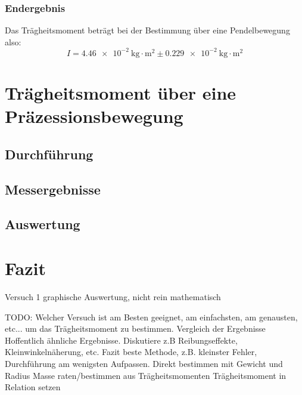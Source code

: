 \documentclass{article}
\begin{document}
			\subsubsection{Endergebnis}
				Das Trägheitsmoment beträgt bei der Bestimmung über eine Pendelbewegung also:
				\begin{equation}
					I = \SI{4,46e-2}{ \kilogram \cdot \metre^2 } \pm \SI{0,229e-2}{ \kilogram \cdot \metre^2 }
				\end{equation}


	\section{Trägheitsmoment über eine Präzessionsbewegung}
		\subsection{Durchführung}

		\subsection{Messergebnisse}
		
		\subsection{Auswertung}

	\section{Fazit}
		Versuch 1 graphische Auswertung, nicht rein mathematisch

		TODO: Welcher Versuch ist am Besten geeignet, am einfachsten, am genausten, etc... um das Trägheitsmoment zu bestimmen.
		Vergleich der Ergebnisse
		Hoffentlich ähnliche Ergebnisse.
		Diskutiere z.B Reibungseffekte, Kleinwinkelnäherung, etc.
		Fazit beste Methode, z.B. kleinster Fehler, Durchführung am wenigsten Aufpassen.
		Direkt bestimmen mit Gewicht und Radius
        Masse raten/bestimmen aus Trägheitsmomenten
		Trägheitsmoment in Relation setzen

	\printbibliography[title={Quellen}]
\end{document}
